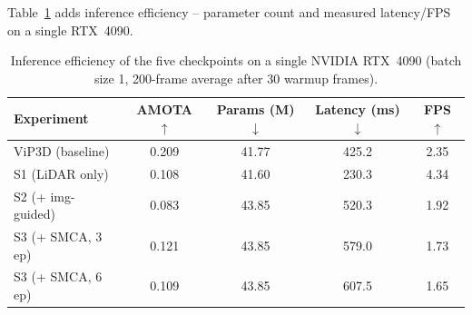 \documentclass[12pt,a4paper]{report}
\begin{document}
\begin{table}[H]
\centering
\caption{Raw nuScenes tracking counts underlying the AMOTA column of Table~\ref{tab:livip3d_results}: matched true positives (TP), false positives (FP) and false negatives (FN), summed over the validation split. Shaded columns: per-class AMOTA.}
\label{tab:livip3d_tpfp}
\footnotesize
\setlength{\tabcolsep}{3pt}
\end{table}

\quad Table~\ref{tab:livip3d_efficiency} adds inference efficiency -- parameter count and measured latency/FPS on a single RTX~4090. 

\begin{table}[H]
\centering
\caption{Inference efficiency of the five checkpoints on a single NVIDIA RTX~4090 (batch size 1, 200-frame average after 30 warmup frames).}
\label{tab:livip3d_efficiency}
\small
\begin{tabular}{lcccc}
\hline
Experiment & AMOTA $\uparrow$ & Params (M) $\downarrow$ & Latency (ms) $\downarrow$ & FPS $\uparrow$ \\
\hline
ViP3D (baseline) & 0.209 & 41.77 & 425.2 & 2.35 \\
S1 (LiDAR only) & 0.108 & 41.60 & 230.3 & 4.34 \\
S2 (+ img-guided) & 0.083 & 43.85 & 520.3 & 1.92 \\
S3 (+ SMCA, 3 ep) & 0.121 & 43.85 & 579.0 & 1.73 \\
S3 (+ SMCA, 6 ep) & 0.109 & 43.85 & 607.5 & 1.65 \\
\hline
\end{tabular}
\end{table}
\end{document}
